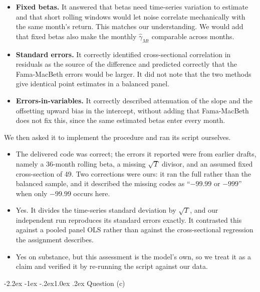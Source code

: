 \documentclass[11pt]{article}
\makeatletter
\renewcommand\subsection{\@startsection{subsection}{2}{0pt}%
  {-2.2ex \@plus -1ex \@minus -.2ex}{1.0ex \@plus .2ex}%
  {\normalfont\bfseries\normalsize\color{psink}}}
\newenvironment{tight}
  {\begin{itemize}\setlength{\itemsep}{3pt}\setlength{\parskip}{0pt}%
   \setlength{\topsep}{3pt}\setlength{\leftmargini}{1.4em}}
  {\end{itemize}}
\makeatother
\begin{document}
\begin{tight}
\item \textbf{Fixed betas.} It answered that betas need time-series variation
to estimate and that short rolling windows would let noise correlate
mechanically with the same month's return. This matches our understanding. We
would add that fixed betas also make the monthly $\hat\gamma_{Mt}$ comparable
across months.
\item \textbf{Standard errors.} It correctly identified cross-sectional
correlation in residuals as the source of the difference and predicted
correctly that the Fama-MacBeth errors would be larger. It did not note that
the two methods give identical point estimates in a balanced panel.
\item \textbf{Errors-in-variables.} It correctly described attenuation of the
slope and the offsetting upward bias in the intercept, without adding that
Fama-MacBeth does not fix this, since the same estimated betas enter every
month.
\end{tight}

We then asked it to implement the procedure and ran its script ourselves.

\begin{tight}
\item[(i)] The delivered code was correct; the errors it reported were from
earlier drafts, namely a 36-month rolling beta, a missing $\sqrt{T}$ divisor,
and an assumed fixed cross-section of 49. Two corrections were ours: it ran the
full rather than the balanced sample, and it described the missing codes as
``$-99.99$ or $-999$'' when only $-99.99$ occurs here.
\item[(ii)] Yes. It divides the time-series standard deviation by $\sqrt{T}$,
and our independent run reproduces its standard errors exactly. It contrasted
this against a pooled panel OLS rather than against the cross-sectional
regression the assignment describes.
\item[(iii)] Yes on substance, but this assessment is the model's own, so we
treat it as a claim and verified it by re-running the script against our data.
\end{tight}

\subsection{Question (c)}
\end{document}
